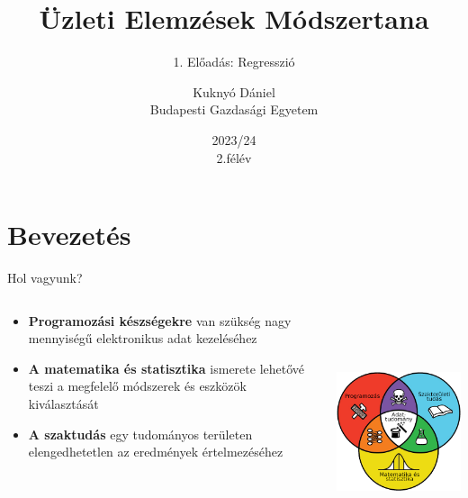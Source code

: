 \documentclass[english, aspectratio=169]{beamer}
\makeatletter
\newcommand\makebeamertitle{\frame{\maketitle}}
\let\origtableofcontents=\tableofcontents
\def\tableofcontents{\@ifnextchar[{\origtableofcontents}{\gobbletableofcontents}}
\def\gobbletableofcontents#1{\origtableofcontents}
\makeatother
\begin{document}
\section{Bevezetés}
\title[]{Üzleti Elemzések Módszertana}
\subtitle{1. Előadás: Regresszió}
\author[Kuknyó Dániel]{Kuknyó Dániel\\Budapesti Gazdasági Egyetem}
\date{2023/24\\2.félév}
\makebeamertitle

\begin{frame}
\tableofcontents{}
\end{frame}

\begin{frame}
\tableofcontents[currentsection]
\end{frame}


\begin{frame}{Hol vagyunk?}
\begin{columns}
\begin{column}{.5\textwidth}
\begin{itemize}
  \item \textbf{Programozási készségekre} van szükség nagy mennyiségű elektronikus adat kezeléséhez
  \item \textbf{A matematika és statisztika} ismerete lehetővé teszi a megfelelő módszerek és eszközök kiválasztását
  \item \textbf{A szaktudás} egy tudományos területen elengedhetetlen az eredmények értelmezéséhez
\end{itemize}
\end{column}
\begin{column}{.5\textwidth}
\begin{center}
\includegraphics[width=7cm, height=7cm, keepaspectratio]{images/regresszio_1.png}
\end{center}
\end{column}
\end{columns}
\end{frame}
\end{document}

